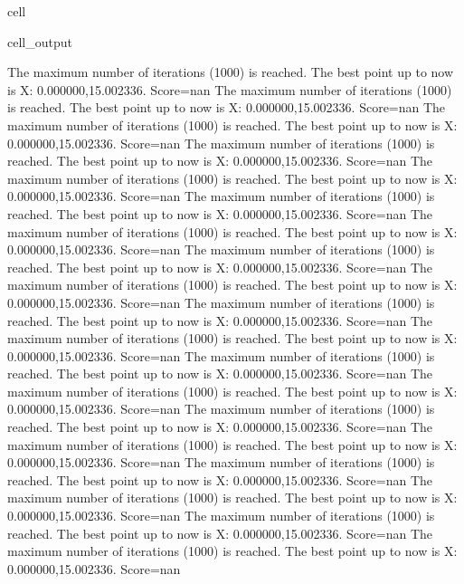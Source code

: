 \documentclass[letterpaper,10pt,english]{jupyterBook}
\begin{document}
\begin{sphinxuseclass}{cell}
\begin{sphinxVerbatimOutput}
\begin{sphinxuseclass}{cell_output}
\begin{sphinxVerbatim}[commandchars=\\\{\}]
The maximum number of iterations (1000) is reached. The best point up to now is X: \PYGZob{}0.000000,15.002336\PYGZcb{}. Score=\PYGZhy{}nan
The maximum number of iterations (1000) is reached. The best point up to now is X: \PYGZob{}0.000000,15.002336\PYGZcb{}. Score=\PYGZhy{}nan
The maximum number of iterations (1000) is reached. The best point up to now is X: \PYGZob{}0.000000,15.002336\PYGZcb{}. Score=\PYGZhy{}nan
The maximum number of iterations (1000) is reached. The best point up to now is X: \PYGZob{}0.000000,15.002336\PYGZcb{}. Score=\PYGZhy{}nan
The maximum number of iterations (1000) is reached. The best point up to now is X: \PYGZob{}0.000000,15.002336\PYGZcb{}. Score=\PYGZhy{}nan
The maximum number of iterations (1000) is reached. The best point up to now is X: \PYGZob{}0.000000,15.002336\PYGZcb{}. Score=\PYGZhy{}nan
The maximum number of iterations (1000) is reached. The best point up to now is X: \PYGZob{}0.000000,15.002336\PYGZcb{}. Score=\PYGZhy{}nan
The maximum number of iterations (1000) is reached. The best point up to now is X: \PYGZob{}0.000000,15.002336\PYGZcb{}. Score=\PYGZhy{}nan
The maximum number of iterations (1000) is reached. The best point up to now is X: \PYGZob{}0.000000,15.002336\PYGZcb{}. Score=\PYGZhy{}nan
The maximum number of iterations (1000) is reached. The best point up to now is X: \PYGZob{}0.000000,15.002336\PYGZcb{}. Score=\PYGZhy{}nan
The maximum number of iterations (1000) is reached. The best point up to now is X: \PYGZob{}0.000000,15.002336\PYGZcb{}. Score=\PYGZhy{}nan
The maximum number of iterations (1000) is reached. The best point up to now is X: \PYGZob{}0.000000,15.002336\PYGZcb{}. Score=\PYGZhy{}nan
The maximum number of iterations (1000) is reached. The best point up to now is X: \PYGZob{}0.000000,15.002336\PYGZcb{}. Score=\PYGZhy{}nan
The maximum number of iterations (1000) is reached. The best point up to now is X: \PYGZob{}0.000000,15.002336\PYGZcb{}. Score=\PYGZhy{}nan
The maximum number of iterations (1000) is reached. The best point up to now is X: \PYGZob{}0.000000,15.002336\PYGZcb{}. Score=\PYGZhy{}nan
The maximum number of iterations (1000) is reached. The best point up to now is X: \PYGZob{}0.000000,15.002336\PYGZcb{}. Score=\PYGZhy{}nan
The maximum number of iterations (1000) is reached. The best point up to now is X: \PYGZob{}0.000000,15.002336\PYGZcb{}. Score=\PYGZhy{}nan
The maximum number of iterations (1000) is reached. The best point up to now is X: \PYGZob{}0.000000,15.002336\PYGZcb{}. Score=\PYGZhy{}nan
The maximum number of iterations (1000) is reached. The best point up to now is X: \PYGZob{}0.000000,15.002336\PYGZcb{}. Score=\PYGZhy{}nan

\end{sphinxVerbatim}
\end{sphinxuseclass}
\end{sphinxVerbatimOutput}
\end{sphinxuseclass}
\end{document}
